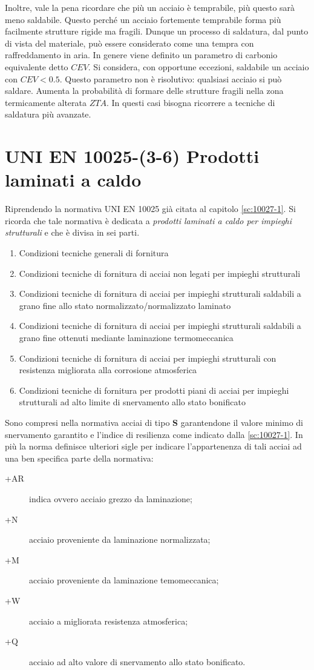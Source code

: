Inoltre, vale la pena ricordare che più un acciaio è temprabile, più questo sarà meno saldabile.
Questo perché un acciaio fortemente temprabile forma più facilmente strutture rigide ma fragili. Dunque un processo di saldatura, dal punto di vista del materiale, può essere considerato come una tempra con raffreddamento in aria.
In genere viene definito un parametro di carbonio equivalente detto $CEV$.
Si considera, con opportune eccezioni, saldabile un acciaio con $CEV < 0.5$.
Questo parametro non è risolutivo: qualsiasi acciaio si può saldare. Aumenta la probabilità di formare delle strutture fragili nella zona termicamente alterata $ZTA$.
In questi casi bisogna ricorrere a tecniche di saldatura più avanzate.

\section{UNI EN 10025-(3-6) Prodotti laminati a caldo}
Riprendendo la normativa UNI EN 10025 già citata al capitolo \ref{sc:10027-1}.
Si ricorda che tale normativa è dedicata a \emph{prodotti laminati a caldo per impieghi strutturali} e che è divisa in sei parti.

\begin{enumerate}
\item Condizioni tecniche generali di fornitura
\item Condizioni tecniche di fornitura di acciai non legati per impieghi strutturali
\item Condizioni tecniche di fornitura di acciai per impieghi strutturali saldabili a grano fine allo stato normalizzato/normalizzato laminato
\item Condizioni tecniche di fornitura di acciai per impieghi strutturali saldabili a grano fine ottenuti mediante laminazione termomeccanica
\item Condizioni tecniche di fornitura di acciai per impieghi strutturali con resistenza migliorata alla corrosione atmosferica
\item Condizioni tecniche di fornitura per prodotti piani di acciai per impieghi strutturali ad alto limite di snervamento allo stato bonificato
\end{enumerate}

Sono compresi nella normativa acciai di tipo \textbf{S} garantendone il valore minimo di snervamento garantito e l'indice di resilienza come indicato dalla \ref{sc:10027-1}.
In più la norma definisce ulteriori sigle per indicare l'appartenenza di tali acciai ad una ben specifica parte della normativa:
\begin{description}
\item[+AR] indica  ovvero acciaio grezzo da laminazione;
\item[+N] acciaio proveniente da laminazione normalizzata;
\item[+M] acciaio proveniente da laminazione temomeccanica;
\item[+W] acciaio a migliorata resistenza atmosferica;
\item[+Q] acciaio ad alto valore di snervamento allo stato bonificato.
\end{description}

